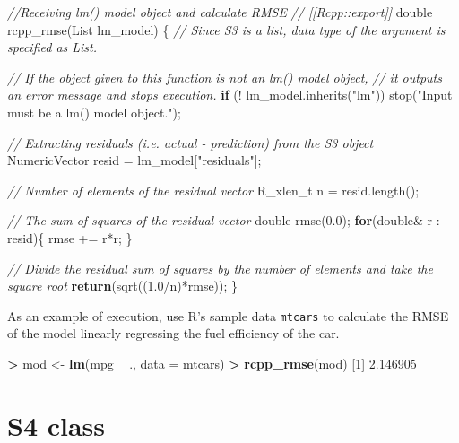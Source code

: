 \documentclass[]{book}
\newenvironment{Shaded}{\begin{snugshade}}{\end{snugshade}}
\newcommand{\KeywordTok}[1]{\textcolor[rgb]{0.13,0.29,0.53}{\textbf{#1}}}
\newcommand{\DataTypeTok}[1]{\textcolor[rgb]{0.13,0.29,0.53}{#1}}
\newcommand{\DecValTok}[1]{\textcolor[rgb]{0.00,0.00,0.81}{#1}}
\newcommand{\FloatTok}[1]{\textcolor[rgb]{0.00,0.00,0.81}{#1}}
\newcommand{\StringTok}[1]{\textcolor[rgb]{0.31,0.60,0.02}{#1}}
\newcommand{\CommentTok}[1]{\textcolor[rgb]{0.56,0.35,0.01}{\textit{#1}}}
\newcommand{\ControlFlowTok}[1]{\textcolor[rgb]{0.13,0.29,0.53}{\textbf{#1}}}
\newcommand{\OperatorTok}[1]{\textcolor[rgb]{0.81,0.36,0.00}{\textbf{#1}}}
\newcommand{\NormalTok}[1]{#1}
\theoremstyle{definition}
\theoremstyle{definition}
\theoremstyle{remark}
\begin{document}
\begin{Shaded}
\begin{Highlighting}[]
\CommentTok{//Receiving lm() model object and calculate RMSE}
\CommentTok{// [[Rcpp::export]]}
\DataTypeTok{double}\NormalTok{ rcpp_rmse(List lm_model) \{}
    \CommentTok{// Since S3 is a list, data type of the argument is specified as List.}

    \CommentTok{// If the object given to this function is not an lm() model object,}
    \CommentTok{// it outputs an error message and stops execution.}
    \ControlFlowTok{if}\NormalTok{ (! lm_model.inherits(}\StringTok{"lm"}\NormalTok{)) stop(}\StringTok{"Input must be a lm() model object."}\NormalTok{);}

    \CommentTok{// Extracting residuals (i.e. actual - prediction) from the S3 object}
\NormalTok{    NumericVector resid  = lm_model[}\StringTok{"residuals"}\NormalTok{];}

    \CommentTok{// Number of elements of the residual vector}
    \DataTypeTok{R_xlen_t}\NormalTok{ n = resid.length();}

    \CommentTok{// The sum of squares of the residual vector}
    \DataTypeTok{double}\NormalTok{ rmse(}\FloatTok{0.0}\NormalTok{);}
    \ControlFlowTok{for}\NormalTok{(}\DataTypeTok{double}\NormalTok{& r : resid)\{}
\NormalTok{        rmse += r*r;}
\NormalTok{    \}}

    \CommentTok{// Divide the residual sum of squares by the number of elements and take the square root}
    \ControlFlowTok{return}\NormalTok{(sqrt((}\FloatTok{1.0}\NormalTok{/n)*rmse));}
\NormalTok{\}}
\end{Highlighting}
\end{Shaded}

As an example of execution, use R's sample data \texttt{mtcars} to
calculate the RMSE of the model linearly regressing the fuel efficiency
of the car.

\begin{Shaded}
\begin{Highlighting}[]
\OperatorTok{>}\StringTok{ }\NormalTok{mod <-}\StringTok{ }\KeywordTok{lm}\NormalTok{(mpg }\OperatorTok{~}\StringTok{ }\NormalTok{., }\DataTypeTok{data =}\NormalTok{ mtcars)}
\OperatorTok{>}\StringTok{ }\KeywordTok{rcpp_rmse}\NormalTok{(mod)}
\NormalTok{[}\DecValTok{1}\NormalTok{] }\FloatTok{2.146905}
\end{Highlighting}
\end{Shaded}

\section{S4 class}\label{s4-class}
\end{document}
